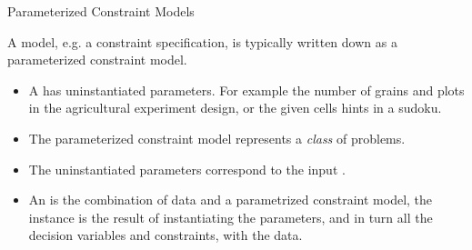 \documentclass{cons-beamer}
\begin{document}
\begin{frame}{Parameterized Constraint Models}
	
	A model, e.g. a constraint specification, is typically written down as a parameterized constraint model.
	\vfill
	
	\begin{itemize}
		\item A  has uninstantiated parameters. 
		For example the number of grains and plots in the agricultural experiment design, or the given cells hints in a sudoku. \vfill
		
		\item The parameterized constraint model represents a \textit{class} of problems.\vfill
		
		\item The uninstantiated parameters correspond to the input .\vfill
		
		\item An  is the combination of data and a parametrized constraint model, the instance is the result of instantiating the parameters, and in turn all the decision variables and constraints, with the data. 
	\end{itemize}
\end{frame}
\end{document}
